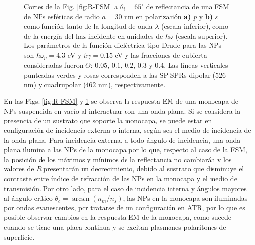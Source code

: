 \begin{figure}[h!]
	\caption{Cortes de la Fig. \ref{fig:R-FSM} a $\theta_i = 65^\circ$ de reflectancia de una FSM de NPs esféricas de radio $a=30$ nm en polarización \textbf{a)} \emph{p} y \textbf{b)} \emph{s} como función tanto de la longitud de onda $\lambda$ (escala inferior), como de la energía del haz incidente en unidades de $\hbar\omega$ (escala superior). Los parámetros de la función dieléctrica tipo Drude para las NPs son $\hbar\omega_p = 4.3$ eV y $\hbar\gamma = 0.15$ eV y las fracciones de cubierta consideradas fueron $\Theta$: $0. 05$, $0. 1$, $0. 2$, $0. 3$ y $0. 4$. Las líneas verticales punteadas verdes y rosas corresponden a las SP-SPRs dipolar ($526$ nm) y cuadrupolar ($462$ nm), respectivamente.}\label{fig:FSM-Cuts}
	\end{figure}	


En las Figs. \ref{fig:R-FSM} y \ref{fig:FSM-Cuts} se observa la respuesta EM de una monocapa de NPs suspendida en vacío al interactuar con una onda plana. Si se considera la presencia de un sustrato que soporte la monocapa, se puede estar en configuraci\'on de incidencia externa o interna, seg\'un sea el medio de incidencia de la onda plana. Para incidencia externa, a todo ángulo de incidencia,  una onda plana ilumina a las NPs de la monocapa por lo que, respecto al caso de la FSM, la posición de los máximos y mínimos de la reflectancia no cambiarán y los valores de $R$ presentarán un decrecimiento, debido al sustrato que disminuye el contraste entre índice de refracción de las NPs en la monocapa y el medio de transmisión. Por otro lado, para el caso de incidencia interna y ángulos mayores al ángulo crítico $\theta_c = \arcsin(n_m/n_s)$, las NPs en la monocapa son iluminadas por ondas evanescentes, por tratarse de un configuración en ATR, por lo que es posible  observar cambios en la respuesta EM de la monocapa, como sucede  cuando se tiene una placa continua y se excitan plasmones polaritones de superficie.


